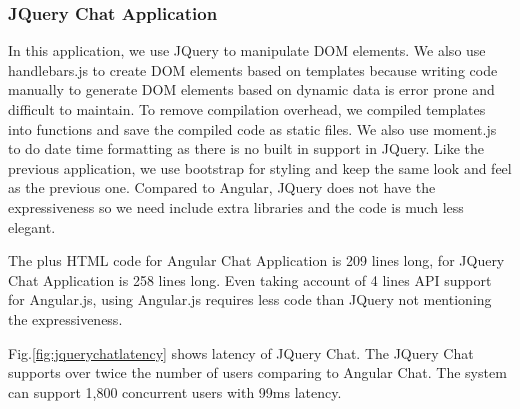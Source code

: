 \subsubsection{JQuery Chat Application}
\label{sec:jquery}
In this application, we use JQuery to manipulate DOM elements.
We also use handlebars.js to create DOM elements based on templates
because writing code manually to generate DOM elements based on dynamic data 
is error prone and difficult to maintain.
To remove compilation overhead, 
we compiled templates into \js{} functions and save the compiled code as static files.
We also use moment.js to do date time formatting as there is no built in support 
in JQuery.
Like the previous application, we use bootstrap for styling and keep the same look
and feel as the previous one.
Compared to Angular, JQuery does not have the expressiveness so we need include 
extra libraries and the code is much less elegant. 

The \js{} plus HTML code for Angular Chat Application is 209 lines long,
for JQuery Chat Application is 258 lines long.
Even taking account of 4 lines API support for Angular.js, 
using Angular.js requires less code than JQuery not mentioning the expressiveness.

Fig.\ref{fig:jquerychatlatency} shows latency of JQuery Chat.
The JQuery Chat supports over twice the number of users comparing to Angular Chat.
The system can support 1,800 concurrent users with 99ms latency.

\jquerychatlatency{}


